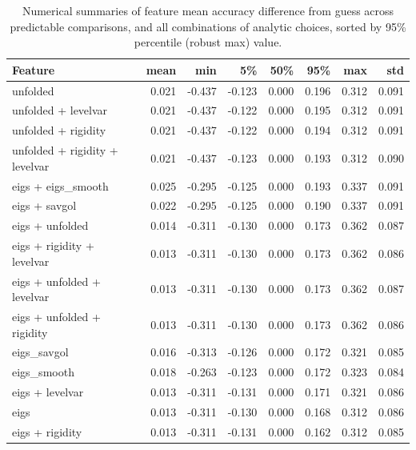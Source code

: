 \documentclass{article}  %
\begin{document}
\begin{table}[H]
\caption{Numerical summaries of feature mean accuracy difference from guess
across predictable comparisons, and all combinations of analytic choices,
sorted by 95\% percentile (robust max) value.}
\label{tab:acc-numerical}
\small
\centering

\begin{tabular}{lrrrrrrr}
\hline
Feature &      mean &       min &        5\% &       50\% &       95\% &       max &       std \\
\hline
unfolded                       &  0.021 & -0.437 & -0.123 &  0.000 &  0.196 &  0.312 &  0.091 \\
unfolded + levelvar            &  0.021 & -0.437 & -0.122 &  0.000 &  0.195 &  0.312 &  0.091 \\
unfolded + rigidity            &  0.021 & -0.437 & -0.122 &  0.000 &  0.194 &  0.312 &  0.091 \\
unfolded + rigidity + levelvar &  0.021 & -0.437 & -0.123 &  0.000 &  0.193 &  0.312 &  0.090 \\
eigs + eigs\_smooth             &  0.025 & -0.295 & -0.125 &  0.000 &  0.193 &  0.337 &  0.091 \\
eigs + savgol                  &  0.022 & -0.295 & -0.125 &  0.000 &  0.190 &  0.337 &  0.091 \\
eigs + unfolded                &  0.014 & -0.311 & -0.130 &  0.000 &  0.173 &  0.362 &  0.087 \\
eigs + rigidity + levelvar     &  0.013 & -0.311 & -0.130 &  0.000 &  0.173 &  0.362 &  0.086 \\
eigs + unfolded + levelvar     &  0.013 & -0.311 & -0.130 &  0.000 &  0.173 &  0.362 &  0.087 \\
eigs + unfolded + rigidity     &  0.013 & -0.311 & -0.130 &  0.000 &  0.173 &  0.362 &  0.086 \\
eigs\_savgol                    &  0.016 & -0.313 & -0.126 &  0.000 &  0.172 &  0.321 &  0.085 \\
eigs\_smooth                    &  0.018 & -0.263 & -0.123 &  0.000 &  0.172 &  0.323 &  0.084 \\
eigs + levelvar                &  0.013 & -0.311 & -0.131 &  0.000 &  0.171 &  0.321 &  0.086 \\
eigs                           &  0.013 & -0.311 & -0.130 &  0.000 &  0.168 &  0.312 &  0.086 \\
eigs + rigidity                &  0.013 & -0.311 & -0.131 &  0.000 &  0.162 &  0.312 &  0.085 \\

\end{tabular}
\end{table}
\end{document}
